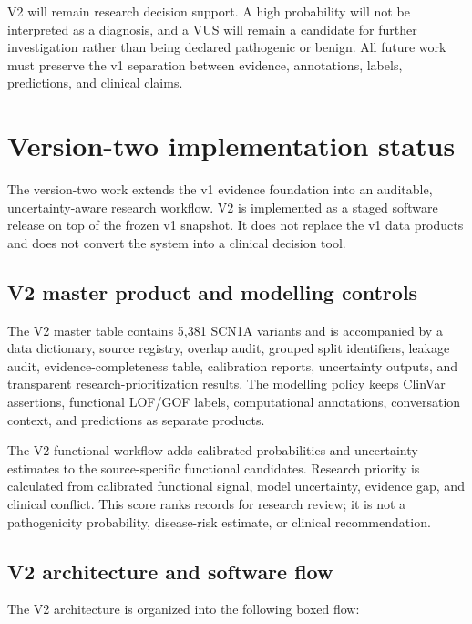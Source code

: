 \documentclass[12pt,a4paper]{article}
\begin{document}
V2 will remain research decision support. A high probability will not be
interpreted as a diagnosis, and a VUS will remain a candidate for further
investigation rather than being declared pathogenic or benign. All future work
must preserve the v1 separation between evidence, annotations, labels,
predictions, and clinical claims.

\section{Version-two implementation status}
The version-two work extends the v1 evidence foundation into an auditable,
uncertainty-aware research workflow. V2 is implemented as a staged software
release on top of the frozen v1 snapshot. It does not replace the v1 data
products and does not convert the system into a clinical decision tool.

\subsection{V2 master product and modelling controls}
The V2 master table contains 5,381 SCN1A variants and is accompanied by a data
dictionary, source registry, overlap audit, grouped split identifiers, leakage
audit, evidence-completeness table, calibration reports, uncertainty outputs,
and transparent research-prioritization results. The modelling policy keeps
ClinVar assertions, functional LOF/GOF labels, computational annotations,
conversation context, and predictions as separate products.

The V2 functional workflow adds calibrated probabilities and uncertainty
estimates to the source-specific functional candidates. Research priority is
calculated from calibrated functional signal, model uncertainty, evidence gap,
and clinical conflict. This score ranks records for research review; it is not a
pathogenicity probability, disease-risk estimate, or clinical recommendation.

\subsection{V2 architecture and software flow}
The V2 architecture is organized into the following boxed flow:
\end{document}
